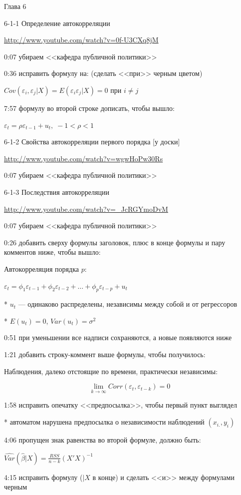 \documentclass[12pt,a4paper]{article}
\newcommand{\e}{\varepsilon}
\begin{document}
Глава 6

6-1-1 Определение автокорреляции 

\url{http://www.youtube.com/watch?v=0f-U3CXq8jM}

0:07 убираем <<кафедра публичной политики>>

0:36 исправить формулу на: (сделать <<при>> черным цветом)

$Cov(\e_i,\e_j|X)=E(\e_i \e_j|X)=0$ при $i\neq j$

7:57 формулу во второй строке дописать, чтобы вышло:

$\e_t=\rho \e_{t-1} + u_t, \; -1 < \rho <1 $

6-1-2 Свойства автокорреляции первого порядка [у доски] 

\url{http://www.youtube.com/watch?v=wgwHoPw30Rs}

0:07 убираем <<кафедра публичной политики>>

6-1-3 Последствия автокорреляции 

\url{http://www.youtube.com/watch?v=_JcRGYmoDvM}

0:07 убираем <<кафедра публичной политики>>

0:26 добавить сверху формулы заголовок, плюс в конце формулы и пару комментов ниже, чтобы вышло:

Автокорреляция порядка $p$:

$\e_{t}=\phi_1 \e_{t-1}+\phi_2 \e_{t-2} +\ldots + \phi_p \e_{t-p}+u_t$

* $u_t$ --- одинаково распределены, независимы между собой и от регрессоров

* $E(u_t)=0$, $Var(u_t)=\sigma^2$

0:51 при уменьшении все надписи сохраняются, а новые появляются ниже

1:21 добавить строку-коммент выше формулы, чтобы получилось:

Наблюдения, далеко отстоящие по времени, практически независимы:

\[
\lim_{k\to\infty} Corr(\e_t, \e_{t-k})=0
\]

1:58 исправить опечатку <<предпосылка>>, чтобы первый пункт выглядел

* автоматом нарушена предпосылка о независимости наблюдений $(x_{i.}, y_i)$

4:06 пропущен знак равенства во второй формуле, должно быть:

$\widehat{Var}(\hat{\beta}|X)=\frac{RSS}{n-k}(X'X)^{-1}$

4:15 исправить формулу ($|X$ в конце) и сделать <<и>> между формулами черным
\end{document}
